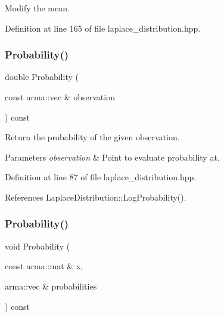 Modify the mean. 



Definition at line 165 of file laplace\+\_\+distribution.\+hpp.

\mbox{\label{classmlpack_1_1distribution_1_1LaplaceDistribution_ab72935d592516e77511d0b5e703c0d41}} 
\subsubsection{Probability()\hspace{0.1cm}{\footnotesize\ttfamily [1/2]}}
{\footnotesize\ttfamily double Probability (\begin{DoxyParamCaption}\item[{const arma\+::vec \&}]{observation }\end{DoxyParamCaption}) const\hspace{0.3cm}{\ttfamily [inline]}}



Return the probability of the given observation. 


\begin{DoxyParams}{Parameters}
{\em observation} & Point to evaluate probability at. \\
\hline
\end{DoxyParams}


Definition at line 87 of file laplace\+\_\+distribution.\+hpp.



References Laplace\+Distribution\+::\+Log\+Probability().

\mbox{\label{classmlpack_1_1distribution_1_1LaplaceDistribution_a1e516aca34e9c99caf1431a822d87fc6}} 
\subsubsection{Probability()\hspace{0.1cm}{\footnotesize\ttfamily [2/2]}}
{\footnotesize\ttfamily void Probability (\begin{DoxyParamCaption}\item[{const arma\+::mat \&}]{x,  }\item[{arma\+::vec \&}]{probabilities }\end{DoxyParamCaption}) const}




